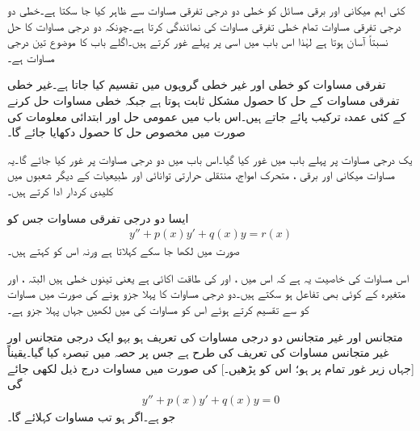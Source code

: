 کئی اہم میکانی اور برقی مسائل کو خطی دو درجی تفرقی مساوات سے ظاہر کیا جا سکتا ہے۔خطی دو درجی تفرقی مساوات  تمام خطی تفرقی مساوات کی نمائندگی کرتا ہے۔چونکہ دو درجی مساوات کا حل نسبتاً آسان ہوتا ہے لہٰذا اس باب میں اسی پر پہلے غور کرتے ہیں۔اگلے باب کا موضوع تین درجی مساوات ہے۔

تفرقی مساوات کو خطی اور غیر خطی گروہوں میں تقسیم کیا جاتا ہے۔غیر خطی تفرقی مساوات کے حل کا حصول مشکل ثابت ہوتا ہے جبکہ خطی مساوات حل کرنے کے کئی عمدہ ترکیب پائے جاتے ہیں۔اس باب میں عمومی حل اور ابتدائی معلومات کی صورت میں مخصوص حل کا حصول دکھایا جائے گا۔

یک درجی مساوات پر پہلے باب میں غور کیا گیا۔اس باب میں دو درجی مساوات پر غور کیا جائے گا۔یہ مساوات میکانی اور برقی ، متحرک امواج، منتقلی حرارتی توانائی اور طبیعیات کے دیگر شعبوں میں کلیدی کردار ادا کرتے ہیں۔

ایسا دو درجی تفرقی مساوات جس کو
\begin{align}\label{مساوات_سادہ_دو_درجی_تعریف}
y''+p(x)y'+q(x)y=r(x)
\end{align}
صورت میں لکھا جا سکے  کہلاتا ہے ورنہ اس کو  کہتے ہیں۔

اس مساوات کی خاصیت یہ ہے کہ اس میں ،  اور  کی طاقت اکائی ہے  یعنی تینوں خطی ہیں البتہ ،  اور  متغیرہ  کے کوئی بھی تفاعل ہو سکتے ہیں۔دو درجی مساوات کا پہلا جزو  ہونے کی صورت میں مساوات کو  سے تقسیم کرتے ہوئے اس کو مساوات  کی  میں لکھیں جہاں   پہلا  جزو ہے۔

متجانس اور غیر متجانس دو درجی مساوات کی تعریف ہو بہو ایک درجی متجانس اور غیر متجانس مساوات کی تعریف کی طرح ہے جس پر حصہ  میں تبصرہ کیا گیا۔یقیناً  [جہاں زیر غور تمام  پر   ہو؛ اس کو  پڑھیں۔] کی صورت میں مساوات  درج ذیل لکھی جائے گی 
\begin{align}\label{مساوات_سادہ_متجانس_دو_درجی_تعریف}
y''+p(x)y'+q(x)y=0
\end{align}
جو  ہے۔اگر  ہو تب مساوات   کہلائے گا۔

